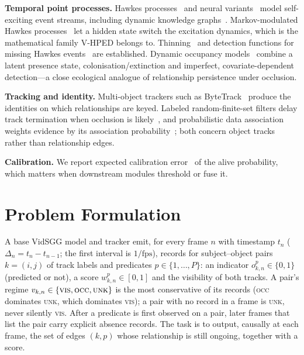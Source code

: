 \documentclass[conference]{IEEEtran}
\newcommand{\VIS}{\textsc{vis}}
\newcommand{\OCC}{\textsc{occ}}
\newcommand{\UNK}{\textsc{unk}}
\begin{document}
\textbf{Temporal point processes.} Hawkes processes~\cite{hawkes1971} and neural
variants~\cite{mei2017} model self-exciting event streams, including dynamic knowledge
graphs~\cite{trivedi2017}. Markov-modulated Hawkes processes~\cite{wang2012mmhp} let a
hidden state switch the excitation dynamics, which is the mathematical family V-HPED
belongs to. Thinning~\cite{lewis1979} and detection functions for missing Hawkes
events~\cite{deutsch2020} are established. Dynamic occupancy
models~\cite{mackenzie2003} combine a latent presence state, colonisation/extinction
and imperfect, covariate-dependent detection---a close ecological analogue of
relationship persistence under occlusion.

\textbf{Tracking and identity.} Multi-object trackers such as
ByteTrack~\cite{zhang2022bytetrack} produce the identities on which relationships are
keyed. Labeled random-finite-set filters delay track termination when occlusion is
likely~\cite{kim2016lrfs}, and probabilistic data association weights evidence by its
association probability~\cite{barshalom1975}; both concern object tracks rather than
relationship edges.

\textbf{Calibration.} We report expected calibration error~\cite{guo2017calibration}
of the alive probability, which matters when downstream modules threshold or fuse it.

\section{Problem Formulation}
A base VidSGG model and tracker emit, for every frame $n$ with timestamp $t_n$
($\Delta_n=t_n-t_{n-1}$; the first interval is $1/\mathrm{fps}$), records for
subject--object pairs $k=(i,j)$ of track labels and predicates $p\in\{1,\dots,P\}$:
an indicator $o^p_{k,n}\in\{0,1\}$ (predicted or not), a score $w^p_{k,n}\in[0,1]$ and
the visibility of both tracks. A pair's regime $v_{k,n}\in\{\VIS,\OCC,\UNK\}$ is the
most conservative of its records (\OCC{} dominates \UNK{}, which dominates \VIS{}); a
pair with no record in a frame is \UNK, never silently \VIS. After a predicate is first
observed on a pair, later frames that list the pair carry explicit absence records.
The task is to output, causally at each frame, the set of edges $(k,p)$ whose
relationship is still ongoing, together with a score.

\end{document}
